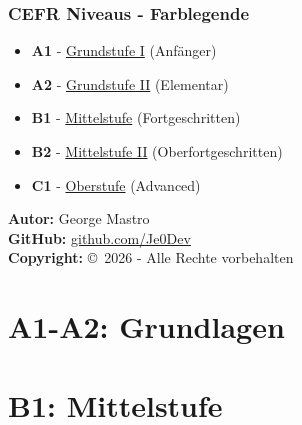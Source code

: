 \documentclass[11pt, a4paper]{book}
\begin{document}
\section{\color{b1color}CEFR Niveaus - Farblegende}
\begin{itemize}
    \item \textcolor{a1color}{\textbf{A1}} - \underline{Grundstufe I} (Anfänger)
    \item \textcolor{a2color}{\textbf{A2}} - \underline{Grundstufe II} (Elementar)
    \item \textcolor{b1color}{\textbf{B1}} - \underline{Mittelstufe} (Fortgeschritten)
    \item \textcolor{b2color}{\textbf{B2}} - \underline{Mittelstufe II} (Oberfortgeschritten)
    \item \textcolor{c1color}{\textbf{C1}} - \underline{Oberstufe} (Advanced)
\end{itemize}

\bigskip
\noindent\textbf{\color{primary}Autor:} George Mastro\\
\textbf{\color{secondary}GitHub:} \href{https://github.com/Je0Dev}{github.com/Je0Dev}\\
\textbf{\color{accent}Copyright:} \copyright\ 2026 - Alle Rechte vorbehalten

\mainmatter

\part{\color{primary}\textbf{A1-A2: Grundlagen}}


\part{\color{secondary}\textbf{B1: Mittelstufe}}








\end{document}

